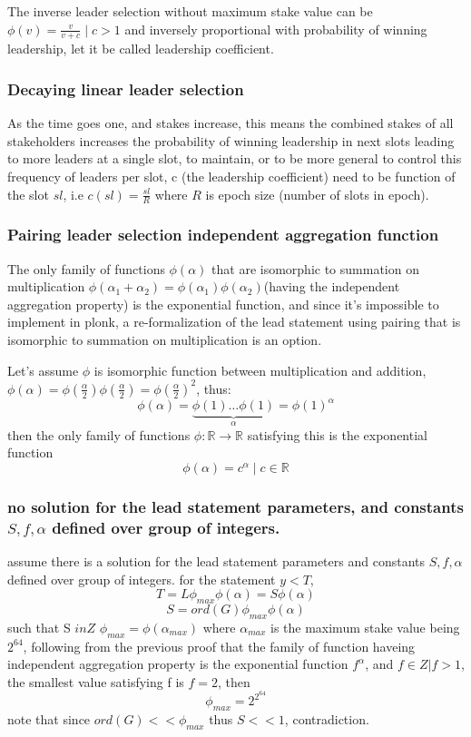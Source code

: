 \documentclass{article}
\begin{document}
The inverse leader selection without maximum stake value can be
$\phi(v)=\frac{v}{v+c} \mid c  > 1$ and inversely proportional
with probability of winning leadership, let it be called leadership
coefficient.


\subsubsection{ Decaying linear leader selection}

As the time goes one, and stakes increase, this means the combined stakes
of all stakeholders increases the probability of winning leadership
in next slots leading to more leaders at a single slot, to maintain,
or to be more general to control this frequency of leaders per slot, c
(the leadership coefficient) need to be function of the slot $sl$, i.e
$c(sl) = \frac{sl}{R}$ where $R$ is epoch size (number of slots in epoch).

\subsubsection{ Pairing leader selection independent aggregation function}

The only family of functions $\phi(\alpha)$ that are isomorphic
to summation on multiplication $\phi(\alpha_1+\alpha_2)
= \phi(\alpha_1)\phi(\alpha_2)$(having the independent aggregation
property) is the exponential function, and since it's impossible to
implement in plonk,  a re-formalization of the lead statement using
pairing that is isomorphic to summation on multiplication is an option.

Let's assume $\phi$ is isomorphic function
between multiplication and addition, $\phi(\alpha) =
\phi(\frac{\alpha}{2})\phi(\frac{\alpha}{2})=\phi(\frac{\alpha}{2})^2$,
thus:
$$\phi(\alpha)=\underbrace{\phi(1)\dots\phi(1)}_\text{$\alpha$}=\phi(1)^\alpha$$
then the only family of functions $\phi : \mathbb{R} \rightarrow
\mathbb{R}$ satisfying this is the exponential function
$$\phi(\alpha)=c^{\alpha} \mid c  \in \mathbb{R}$$

\subsubsection{ no solution for the lead statement parameters, and constants $S,f, \alpha$ defined over group of integers.}

assume there is a solution for the lead statement parameters and constants $S, f, \alpha$ defined over group of integers.
for the statement $y<T$, $$T=L\phi_{max}\phi(\alpha)=S\phi(\alpha)$$
$$S=ord(G)\phi_{max}\phi(\alpha)$$
such that S $in Z$
$\phi_{max}=\phi(\alpha_{max})$ where $\alpha_{max}$ is the maximum stake value being $2^{64}$, following from the previous proof that the family of function haveing independent aggregation property is the exponential function $f^\alpha$, and $f \in Z | f>1$, the smallest value satisfying f is $f=2$, then $$\phi_{max} = 2^{2^{64}}$$
note that since $ord(G)<<\phi_{max}$ thus $S<<1$, contradiction.
\end{document}
